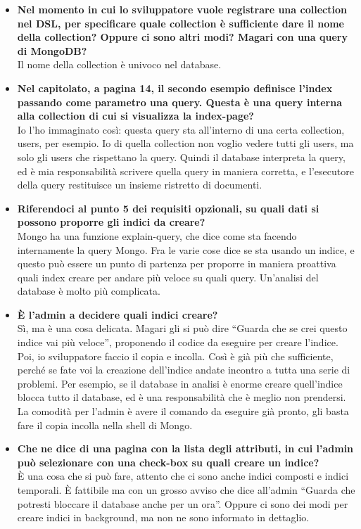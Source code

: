 \begin{itemize}
		\item
		{\bfseries Nel momento in cui lo sviluppatore vuole registrare una collection nel DSL, per specificare quale collection è sufficiente dare il nome della collection? Oppure ci sono altri modi? Magari con una query di MongoDB?} \\
		Il nome della collection è univoco nel database.
		
		\item
		{\bfseries Nel capitolato, a pagina 14, il secondo esempio definisce l'index passando come parametro una query. Questa è una query interna alla collection di cui si visualizza la index-page?} \\
		Io l'ho immaginato così: questa query sta all'interno di una certa collection, users, per esempio. Io di quella collection non voglio vedere tutti gli users, ma solo gli users che rispettano la query. Quindi il database interpreta la query, ed  è mia responsabilità scrivere quella query in maniera corretta, e l'esecutore della query restituisce un insieme ristretto di documenti.
		
		\item
		{\bfseries Riferendoci al punto 5 dei requisiti opzionali, su quali dati si possono proporre gli indici da creare?} \\
		Mongo ha una funzione explain-query, che dice come sta facendo internamente la query Mongo. Fra le varie cose dice se sta usando un indice, e questo può essere un punto di partenza per proporre in maniera proattiva quali index creare per andare più veloce su quali query. Un'analisi del database è molto più complicata.
		
		\item
		{\bfseries È l'admin a decidere quali indici creare?} \\
		Sì, ma è una cosa delicata. Magari gli si può dire ``Guarda che se crei questo indice vai più veloce'', proponendo il codice da eseguire per creare l'indice. Poi, io sviluppatore faccio il copia e incolla. Così è già più che sufficiente, perché se fate voi la creazione dell'indice andate incontro a tutta una serie di problemi. Per esempio, se il database in analisi è enorme creare quell'indice blocca tutto il database, ed è una responsabilità che è meglio non prendersi. La comodità per l'admin è avere il comando da eseguire già pronto, gli basta fare il copia incolla nella shell di Mongo.
		
		\item
		{\bfseries Che ne dice di una pagina con la lista degli attributi, in cui l'admin può selezionare con una check-box su quali creare un indice?} \\
		È una cosa che si può fare, attento che ci sono anche indici composti e indici temporali. È fattibile ma con un grosso avviso che dice all'admin ``Guarda che potresti bloccare il database anche per un ora''. Oppure ci sono dei modi per creare indici in background, ma non ne sono informato in dettaglio.
		

\end{itemize}
